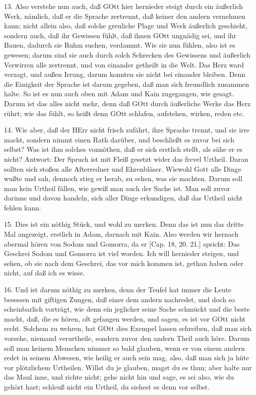 13. Also verstehe nun auch, daß GOtt hier hernieder steigt durch ein äußerlich Werk, nämlich, daß er die Sprache zertrennt, daß keiner den andern vernehmen kann; nicht allein also, daß solche greuliche Plage und Werk äußerlich geschieht, sondern auch, daß ihr Gewissen fühlt, daß ihnen GOtt ungnädig sei, und ihr Bauen, dadurch sie Ruhm suchen, verdammt. Wie sie nun fühlen, also ist es gewesen; darum sind sie auch durch solch Schrecken des Gewissens und äußerlich Verwirren alle zertrennt, und von einander getheilt in die Welt. Das Herz ward verzagt, und außen Irrung, darum konnten sie nicht bei einander bleiben. Denn die Einigkeit der Sprache ist darum gegeben, daß man sich freundlich zusammen halte. So ist es nun auch oben mit Adam und Kain zugegangen, wie gesagt. Darum ist das alles nicht mehr, denn daß GOtt durch äußerliche Werke das Herz rührt; wie das fühlt, so heißt denn GOtt schlafen, aufstehen, wirken, reden etc.

14. Wie aber, daß der HErr nicht frisch zufährt, ihre Sprache trennt, und sie irre macht, sondern nimmt einen Rath darüber, und beschließt es zuvor bei sich selbst? Was ist ihm solches vonnöthen, daß er sich erstlich stellt, als sähe er es nicht? Antwort: Der Spruch ist mit Fleiß gesetzt wider das frevel Urtheil. Daran sollten sich stoßen alle Afterredner und Ehrenbläser. Wiewohl Gott alle Dinge wußte und sah, dennoch stieg er herab, zu sehen, was sie machten. Darum soll man kein Urtheil fällen, wie gewiß man auch der Sache ist. Man soll zuvor darinne und davon handeln, sich aller Dinge erkundigen, daß das Urtheil nicht fehlen kann.

15. Dies ist ein nöthig Stück, und wohl zu merken. Denn das ist nun das dritte Mal angezeigt, erstlich in Adam, darnach mit Kain. Also werden wir hernach abermal hören von Sodom und Gomorra, da er [Cap. 18, 20. 21.] spricht: Das Geschrei Sodom und Gomorra ist viel worden. Ich will hernieder steigen, und sehen, ob sie nach dem Geschrei, das vor mich kommen ist, gethan haben oder nicht, auf daß ich es wisse.

16. Und ist darum nöthig zu merken, denn
der Teufel hat immer die Leute besessen mit giftigen Zungen, daß einer dem andern nachredet, und doch so scheinbarlich vorträgt, wie denn ein jeglicher seine Sache schmückt und die beste macht, daß, die es hören, oft gefangen werden, und sagen, es ist vor GOtt nicht recht. Solchem zu wehren, hat GOtt dies Exempel lassen schreiben, daß man sich vorsehe, niemand verurtheile, sondern zuvor den andern Theil auch höre. Darum soll man keinem Menschen nimmer so bald glauben, wenn er von einem andern redet in seinem Abwesen, wie heilig er auch sein mag, also, daß man sich ja hüte vor plötzlichem Urtheilen. Willst du je glauben, magst du es thun; aber halte nur das Maul inne, und richte nicht; gehe nicht hin und sage, es sei also, wie du gehört hast; schleuß nicht ein Urtheil, du siehest es denn vor selbst.

